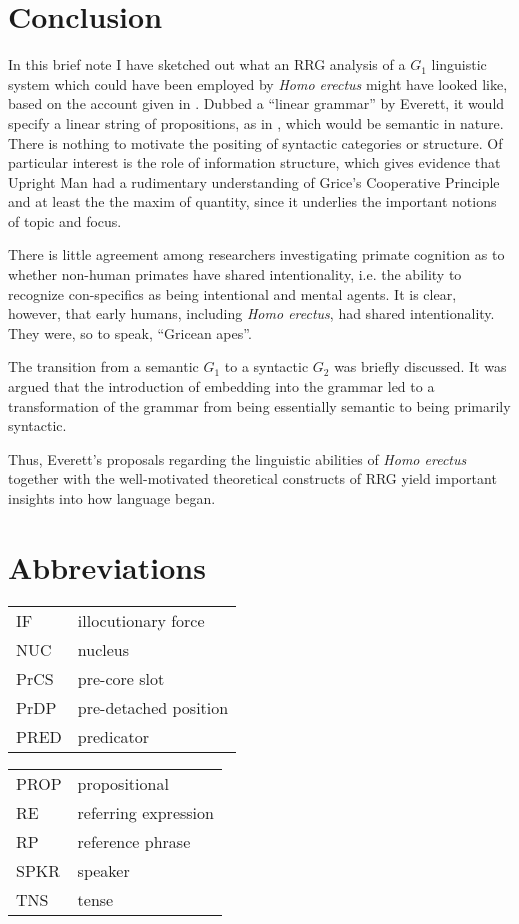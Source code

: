 \documentclass[output=paper,colorlinks,citecolor=brown]{langscibook}
\begin{document}
\section{Conclusion}\label{sec:vanvalin:6}
In this brief note I have sketched out what an RRG analysis of a $G_1$ linguistic system which could have been employed by \emph{Homo erectus} might have looked like, based on the account given in \citet{everett2017language}.  Dubbed a ``linear grammar'' by Everett, it would specify a linear string of propositions, as in , which would be semantic in nature.  There is nothing to motivate the positing of syntactic categories or structure.  Of particular interest is the role of information structure, which gives evidence that Upright Man had a rudimentary understanding of Grice’s Cooperative Principle and at least the the maxim of quantity, since it underlies the important notions of topic and focus.  

There is little agreement among researchers investigating primate cognition as to whether non-human primates have shared intentionality, i.e. the ability to recognize con-specifics as being intentional and mental agents.  It is clear, however, that early humans, including \emph{Homo erectus}, had shared intentionality.  They were, so to speak, ``Gricean apes''.

The transition from a semantic $G_1$ to a syntactic $G_2$ was briefly discussed.  It was argued that the introduction of embedding into the grammar led to a transformation of the grammar from being essentially semantic to being primarily syntactic.

Thus, Everett’s proposals regarding the linguistic abilities of \emph{Homo erectus} together with the well-motivated theoretical constructs of RRG yield important insights into how language began.

\section*{Abbreviations}
\begin{tabularx}{.5\textwidth}{@{}lQ}
\textsc{IF} & illocutionary force \\
\textsc{NUC} & nucleus \\
\textsc{P}r\textsc{CS} & pre-core slot \\
\textsc{P}r\textsc{DP} & pre-detached position \\
\textsc{PRED} & predicator \\
\end{tabularx}\begin{tabularx}{.5\textwidth}{lQ@{}}
\textsc{PROP} & propositional \\
\textsc{RE} & referring expression \\
\textsc{RP} & reference phrase \\
\textsc{SPKR} & speaker \\
\textsc{TNS} & tense \\
\end{tabularx}

\printbibliography[heading=subbibliography,notkeyword=this]
\end{document}
